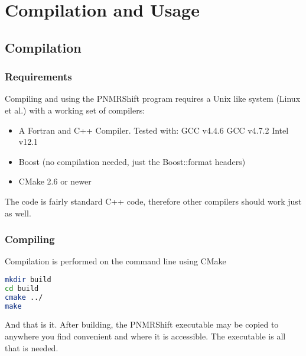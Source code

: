 \documentclass[11pt]{report}
\newcommand\PNMRShift{\textsf{PNMRShift}\xspace}
\newcommand{\etal}{\mbox{\emph{et al}}\xspace}
\renewcommand{\vec}{\bm}
\newcommand{\mat}{\bm}    %
\newcommand{\ten}{\bm}
\newcommand\sd{\mathrm{sd}}
\begin{document}


\chapter{Compilation and Usage}
\label{chap:usage}

\section{Compilation}
\subsection{Requirements}
Compiling and using the \PNMRShift program requires a Unix like system
(Linux et al.) with a working set of compilers:
%
\begin{itemize}
\item A Fortran and C++ Compiler. Tested with:
\subitem GCC v4.4.6
\subitem GCC v4.7.2
\subitem Intel v12.1
\item Boost (no compilation needed, just the Boost::format headers)
\item CMake 2.6 or newer 
\end{itemize}
%
The code is fairly standard C++ code, therefore other compilers should
work just as well.


\subsection{Compiling}
Compilation is performed on the command line using CMake 
%
\begin{lstlisting}[language=Bash]
mkdir build
cd build
cmake ../
make
\end{lstlisting}
%
And that is it.
After building, the PNMRShift executable may be copied to anywhere
you find convenient and where it is accessible. The executable
is all that is needed.
\end{document}

